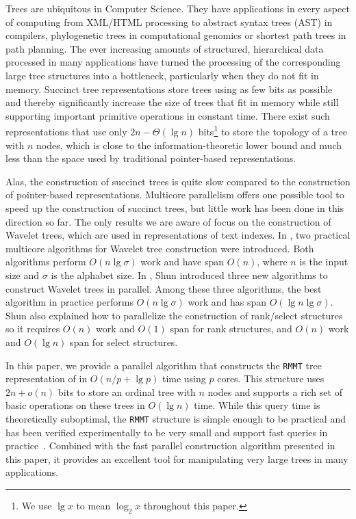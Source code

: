 Trees are ubiquitous in Computer Science.  They have applications in
every aspect of computing from XML/HTML processing to abstract syntax
trees (AST) in compilers, phylogenetic trees in computational genomics
or shortest path trees in path planning.  The ever increasing amounts
of structured, hierarchical data processed in many applications have
turned the processing of the corresponding large tree structures into
a bottleneck, particularly when they do not fit in memory.  Succinct
tree representations store trees using as few bits as possible and
thereby significantly increase the size of trees that fit in memory
while still supporting important primitive operations in constant
time.  There exist such representations that use only $2n - \Theta(\lg
n)$ bits\footnote{We use $\lg x$ to mean $\log_{2}x$ throughout this
paper.} to store the topology of a tree with $n$ nodes, which is close
to the information-theoretic lower bound and much less than the space
used by traditional pointer-based representations.

Alas, the construction of succinct trees is quite slow compared to the
construction of pointer-based representations.  Multicore parallelism
offers one possible tool to speed up the construction of succinct
trees, but little work has been done in this direction so far.  The
only results we are aware of focus on the construction of Wavelet
trees, which are used in representations of text indexes.  In
\cite{Fuentes2014}, two practical multicore algorithms for Wavelet
tree construction were introduced.  Both algorithms perform $O(n\lg
\sigma)$ work and have span $O(n)$, where $n$ is the input size and
$\sigma$ is the alphabet size.  In \cite{DBLP:journals/corr/Shun14},
Shun introduced three new algorithms to construct Wavelet trees in
parallel. Among these three algorithms, the best algorithm in practice
performs $O(n\lg \sigma)$
work and has span $O(\lg n\lg \sigma)$. Shun also explained how to
parallelize the construction of rank/select structures so it requires
$O(n)$ work and $O(1)$ span for rank structures, and $O(n)$ work and
$O(\lg n)$ span for select structures.

In this paper, we provide a parallel algorithm that constructs the
{\tt RMMT} tree representation of
\cite{Navarro:2014:FFS:2620785.2601073} in $O(n/p + \lg p)$ time
using $p$ cores.  This structure uses $2n + o(n)$ bits to store an
ordinal tree with $n$ nodes and supports a rich set of basic
operations on these trees in $O(\lg n)$ time.  While this query time
is theoretically suboptimal, the {\tt RMMT} structure is simple enough
to be practical and has been verified experimentally to be very small
and support fast queries in practice~\cite{ACNSalenex10}.  Combined
with the fast parallel construction algorithm presented in this paper,
it provides an excellent tool for manipulating very large trees in
many applications.

